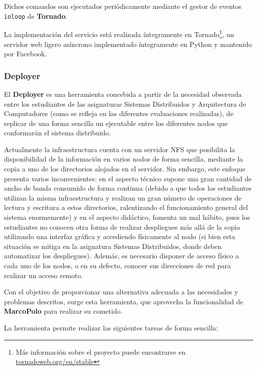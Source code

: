 Dichos comandos son ejecutados periódicamente mediante el gestor de eventos \texttt{ioloop} de \textbf{Tornado}.

La implementación del servicio está realizada íntegramente en Tornado\footnote{Más información sobre el proyecto puede encontrarse en \href{http://www.tornadoweb.org/en/stable/}{tornadoweb.org/en/stable}}, un servidor web ligero asíncrono implementado íntegramente en Python y mantenido por Facebook.

\subsubsection{Deployer}

El \textbf{Deployer} es una herramienta concebida a partir de la necesidad observada entre los estudiantes de las asignaturas Sistemas Distribuidos y Arquitectura de Computadores (como se refleja en las diferentes evaluaciones\citationneeded %
realizadas), de replicar de una forma sencilla un ejecutable entre los diferentes nodos que conformarán el sistema distribuido.

Actualmente la infraestructura cuenta con un servidor NFS que posibilita la disponibilidad de la información en varios nodos de forma sencilla, mediante la copia a uno de los directorios alojados en el servidor. Sin embargo, este enfoque presenta varios inconvenientes: en el aspecto técnico supone una gran cantidad de ancho de banda consumido de forma continua (debido a que todos los estudiantes utilizan la misma infraestructura y realizan un gran número de operaciones de lectura y escritura a estos directorios, ralentizando el funcionamiento general del sistema enormemente) y en el aspecto didáctico, fomenta un mal hábito, pues los estudiantes no conocen otra forma de realizar despliegues más allá de la copia utilizando una interfaz gráfica y accediendo físicamente al nodo (si bien esta situación se mitiga en la asignatura Sistemas Distribuidos, donde deben automatizar los despliegues). Además, es necesario disponer de acceso físico a cada uno de los nodos, o en su defecto, conocer sus direcciones de red para realizar un acceso remoto.

Con el objetivo de proporcionar una alternativa adecuada a las necesidades y problemas descritos, surge esta herramienta, que aprovecha la funcionalidad de \textbf{MarcoPolo} para realizar su cometido.

La herramienta permite realizar las siguientes tareas de forma sencilla:


